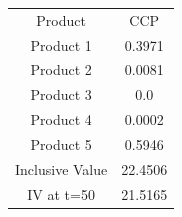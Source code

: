 \begin{tabular}{cc}
Product & CCP \\
Product 1 & 0.3971 \\
Product 2 & 0.0081 \\
Product 3 & 0.0 \\
Product 4 & 0.0002 \\
Product 5 & 0.5946 \\
Inclusive Value & 22.4506 \\
IV at t=50 & 21.5165 \\
\end{tabular}